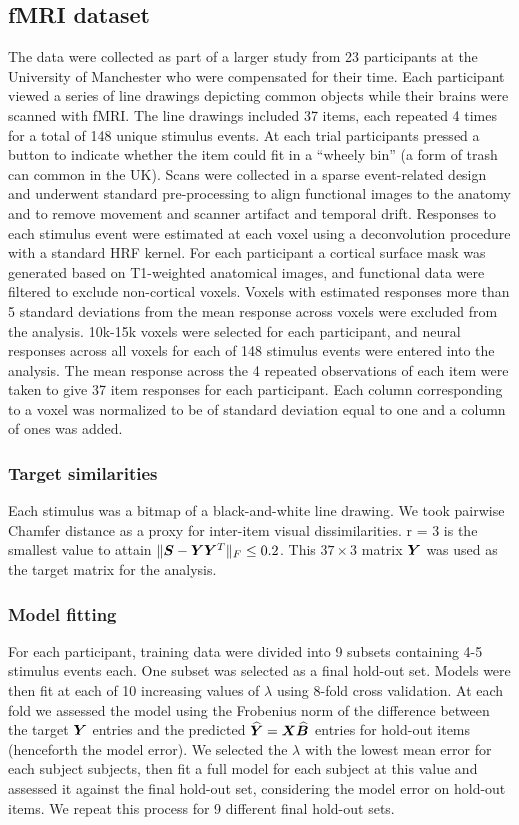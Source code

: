 \subsection{fMRI dataset} The data were collected as part of a larger study from 23 participants at the University of Manchester who were compensated for their time. Each participant viewed a series of line drawings depicting common objects while their brains were scanned with fMRI. The line drawings included 37 items, each repeated 4 times for a total of 148 unique stimulus events. At each trial participants pressed a button to indicate whether the item could fit in a ``wheely bin'' (a form of trash can common in the UK).
Scans were collected in a sparse event-related design and underwent standard pre-processing to align functional images to the anatomy and to remove movement and scanner artifact and temporal drift. Responses to each stimulus event were estimated at each voxel using a deconvolution procedure with a standard HRF kernel. For each participant a cortical surface mask was generated based on T1-weighted anatomical images, and functional data were filtered to exclude non-cortical voxels. Voxels with estimated responses more than 5 standard deviations from the mean response across voxels were excluded from the analysis. 10k-15k voxels were selected for each participant, and neural responses across all voxels for each of 148 stimulus events were entered into the analysis. The mean response across the 4 repeated observations of each item were taken to give 37 item responses for each participant. Each column corresponding to a voxel was normalized to be of standard deviation equal to one and a column of ones was added.

\subsubsection*{Target similarities}
 Each stimulus was a bitmap of a black-and-white line drawing. We took pairwise Chamfer distance as a proxy for inter-item visual dissimilarities. r = 3 is the smallest value to attain $\|\boldsymbol{S} - \boldsymbol{Y}\boldsymbol{Y}^T\|_F \leq 0.2$. This $37 \times 3$ matrix $\boldsymbol{Y}$ was used as the target matrix for the analysis.

\subsubsection*{Model fitting}
For each participant, training data were divided into 9 subsets containing 4-5 stimulus events each. One subset was selected as a final hold-out set. Models were then fit at each of 10 increasing values of $\lambda$ using 8-fold cross validation. At each fold we assessed the model using the Frobenius norm of the difference between the target $\boldsymbol{Y}$ entries and the predicted $\boldsymbol{\widehat{Y}} = \boldsymbol{X}\widehat{\boldsymbol{B}}$ entries for hold-out items (henceforth the model error). We selected the $\lambda$ with the lowest mean error for each subject subjects, then fit a full model for each subject at this value and assessed it against the final hold-out set, considering the model error on hold-out items. We repeat this process for 9 different final hold-out sets.

